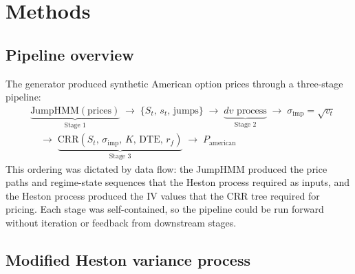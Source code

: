 \section{Methods}\label{sec:methods}

\subsection{Pipeline overview}

The generator produced synthetic American option prices through a three-stage pipeline:
\begin{align}\label{eq:pipeline}
    &\underbrace{\text{JumpHMM}(\text{prices})}_{\text{Stage 1}}
    \;\to\; \{S_t,\, s_t,\, \text{jumps}\}
    \;\to\; \underbrace{dv \text{ process}}_{\text{Stage 2}}
    \;\to\; \sigma_{\text{imp}} = \sqrt{v_t} \nonumber\\
    &\quad\to\; \underbrace{\text{CRR}(S_t,\, \sigma_{\text{imp}},\, K,\, \text{DTE},\, r_f)}_{\text{Stage 3}}
    \;\to\; P_{\text{american}}
\end{align}
This ordering was dictated by data flow: the JumpHMM produced the price paths and regime-state sequences that the Heston process required as inputs, and the Heston process produced the IV values that the CRR tree required for pricing. Each stage was self-contained, so the pipeline could be run forward without iteration or feedback from downstream stages.

\subsection{Modified Heston variance process}\label{sec:theta_function}

